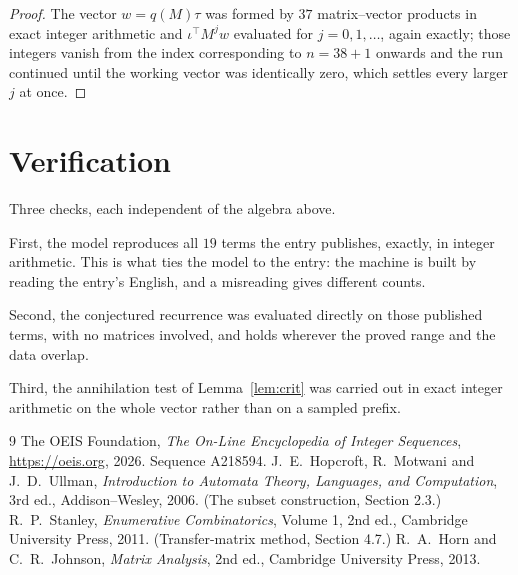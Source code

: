 \documentclass[11pt,a4paper]{article}
\theoremstyle{plain}
\theoremstyle{definition}
\begin{document}
\begin{proof}
The vector $w=q(M)\tau$ was formed by $37$ matrix--vector products in exact integer
arithmetic and $\iota^{\!\top}M^{j}w$ evaluated for $j=0,1,\dots$, again exactly; those
integers vanish from the index corresponding to $n=38+1$ onwards and the run continued
until the working vector was identically zero, which settles every larger $j$ at once.
\end{proof}

\section{Verification}

Three checks, each independent of the algebra above.

First, the model reproduces all $19$ terms the entry publishes, exactly, in integer
arithmetic. This is what ties the model to the entry: the machine is built by reading the
entry's English, and a misreading gives different counts.

Second, the conjectured recurrence was evaluated directly on those published terms, with no
matrices involved, and holds wherever the proved range and the data overlap.

Third, the annihilation test of Lemma~\ref{lem:crit} was carried out in exact integer
arithmetic on the whole vector rather than on a sampled prefix.

\begin{thebibliography}{9}
 The OEIS Foundation, \emph{The On-Line Encyclopedia of Integer
Sequences}, \url{https://oeis.org}, 2026. Sequence A218594.
 J.~E.~Hopcroft, R.~Motwani and J.~D.~Ullman, \emph{Introduction to Automata
Theory, Languages, and Computation}, 3rd ed., Addison--Wesley, 2006. (The subset
construction, Section 2.3.)
 R.~P.~Stanley, \emph{Enumerative Combinatorics}, Volume 1, 2nd ed.,
Cambridge University Press, 2011. (Transfer-matrix method, Section 4.7.)
 R.~A.~Horn and C.~R.~Johnson, \emph{Matrix Analysis}, 2nd ed., Cambridge
University Press, 2013.
\end{thebibliography}
\end{document}
